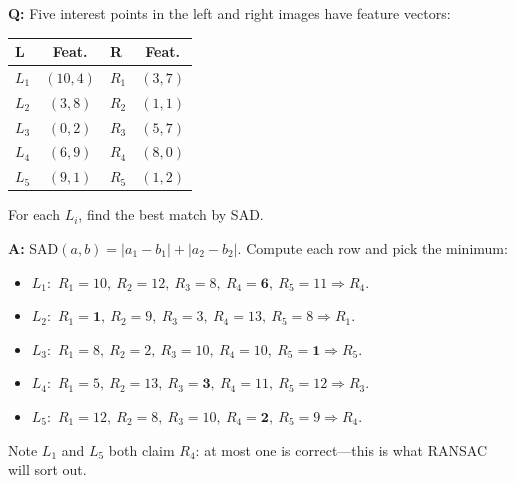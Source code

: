 \begin{exbox}
\textbf{Q:} Five interest points in the left and right images have feature vectors:

\begin{center}
\begin{tabular}{@{} l c l c @{}}
\toprule
\textbf{L} & \textbf{Feat.} & \textbf{R} & \textbf{Feat.} \\
\midrule
$L_1$ & $(10, 4)$ & $R_1$ & $(3, 7)$ \\
$L_2$ & $(3, 8)$  & $R_2$ & $(1, 1)$ \\
$L_3$ & $(0, 2)$  & $R_3$ & $(5, 7)$ \\
$L_4$ & $(6, 9)$  & $R_4$ & $(8, 0)$ \\
$L_5$ & $(9, 1)$  & $R_5$ & $(1, 2)$ \\
\bottomrule
\end{tabular}
\end{center}
For each $L_i$, find the best match by SAD.

\textbf{A:} SAD$(a,b) = |a_1-b_1| + |a_2-b_2|$. Compute each row and pick the minimum:
\begin{itemize}
  \item $L_1{:}$ $R_1{=}10,\ R_2{=}12,\ R_3{=}8,\ R_4{=}\mathbf{6},\ R_5{=}11 \Rightarrow R_4$.
  \item $L_2{:}$ $R_1{=}\mathbf{1},\ R_2{=}9,\ R_3{=}3,\ R_4{=}13,\ R_5{=}8 \Rightarrow R_1$.
  \item $L_3{:}$ $R_1{=}8,\ R_2{=}2,\ R_3{=}10,\ R_4{=}10,\ R_5{=}\mathbf{1} \Rightarrow R_5$.
  \item $L_4{:}$ $R_1{=}5,\ R_2{=}13,\ R_3{=}\mathbf{3},\ R_4{=}11,\ R_5{=}12 \Rightarrow R_3$.
  \item $L_5{:}$ $R_1{=}12,\ R_2{=}8,\ R_3{=}10,\ R_4{=}\mathbf{2},\ R_5{=}9 \Rightarrow R_4$.
\end{itemize}
Note $L_1$ and $L_5$ both claim $R_4$: at most one is correct---this is what RANSAC will sort out.
\end{exbox}

